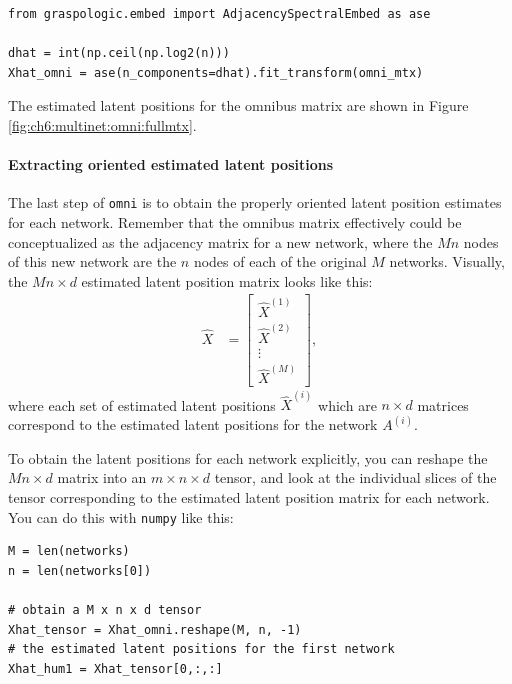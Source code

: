 \begin{lstlisting}[style=python]
from graspologic.embed import AdjacencySpectralEmbed as ase

dhat = int(np.ceil(np.log2(n)))
Xhat_omni = ase(n_components=dhat).fit_transform(omni_mtx)
\end{lstlisting}

The estimated latent positions for the omnibus matrix are shown in Figure \ref{fig:ch6:multinet:omni:fullmtx}.

\paragraph*{Extracting oriented estimated latent positions}

The last step of \texttt{omni} is to obtain the properly oriented latent position estimates for each network. Remember that the omnibus matrix effectively could be conceptualized as the adjacency matrix for a new network, where the $Mn$ nodes of this new network are the $n$ nodes of each of the original $M$ networks. Visually, the $Mn \times d$ estimated latent position matrix looks like this:
\begin{align*}
    \hat X &= \begin{bmatrix}
        \hat X^{(1)} \\
        \hat X^{(2)} \\
        \vdots \\
        \hat X^{(M)}
    \end{bmatrix},
\end{align*}
where each set of estimated latent positions $\hat X^{(i)}$ which are $n \times d$ matrices correspond to the estimated latent positions for the network $A^{(i)}$.

To obtain the latent positions for each network explicitly, you can reshape the $Mn \times d$ matrix into an $m \times n \times d$ tensor, and look at the individual slices of the tensor corresponding to the estimated latent position matrix for each network. You can do this with \texttt{numpy} like this:

\begin{lstlisting}[style=python]
M = len(networks)
n = len(networks[0])

# obtain a M x n x d tensor
Xhat_tensor = Xhat_omni.reshape(M, n, -1)
# the estimated latent positions for the first network
Xhat_hum1 = Xhat_tensor[0,:,:]
\end{lstlisting}

